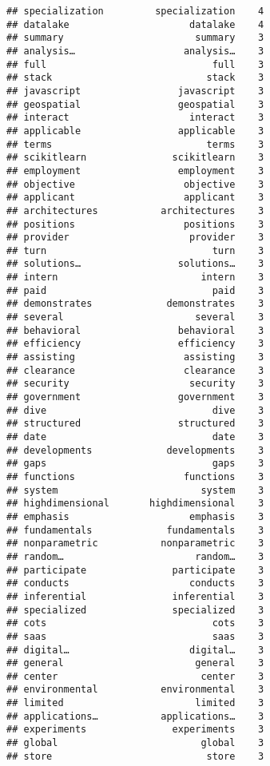 \documentclass[]{article}
\begin{document}
\begin{verbatim}
## specialization         specialization    4
## datalake                     datalake    4
## summary                       summary    3
## analysis…                   analysis…    3
## full                             full    3
## stack                           stack    3
## javascript                 javascript    3
## geospatial                 geospatial    3
## interact                     interact    3
## applicable                 applicable    3
## terms                           terms    3
## scikitlearn               scikitlearn    3
## employment                 employment    3
## objective                   objective    3
## applicant                   applicant    3
## architectures           architectures    3
## positions                   positions    3
## provider                     provider    3
## turn                             turn    3
## solutions…                 solutions…    3
## intern                         intern    3
## paid                             paid    3
## demonstrates             demonstrates    3
## several                       several    3
## behavioral                 behavioral    3
## efficiency                 efficiency    3
## assisting                   assisting    3
## clearance                   clearance    3
## security                     security    3
## government                 government    3
## dive                             dive    3
## structured                 structured    3
## date                             date    3
## developments             developments    3
## gaps                             gaps    3
## functions                   functions    3
## system                         system    3
## highdimensional       highdimensional    3
## emphasis                     emphasis    3
## fundamentals             fundamentals    3
## nonparametric           nonparametric    3
## random…                       random…    3
## participate               participate    3
## conducts                     conducts    3
## inferential               inferential    3
## specialized               specialized    3
## cots                             cots    3
## saas                             saas    3
## digital…                     digital…    3
## general                       general    3
## center                         center    3
## environmental           environmental    3
## limited                       limited    3
## applications…           applications…    3
## experiments               experiments    3
## global                         global    3
## store                           store    3

\end{verbatim}
\end{document}
